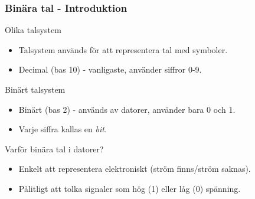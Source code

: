\begin{frame}
\begin{columns}[T]
\begin{column}{0.4\textwidth}
\begin{center}
            \end{center}
        \end{column}
    \end{columns}
    
\end{frame}

\begin{frame}
    \frametitle{Binära tal - Introduktion}
    \begin{block}{Olika talsystem}
        \begin{itemize}
            \item Talsystem används för att representera tal med symboler.
            \item Decimal (bas 10) - vanligaste, använder siffror 0-9.
        \end{itemize}
    \end{block}
    \begin{block}{Binärt talsystem}
        \begin{itemize}
            \item Binärt (bas 2) - används av datorer, använder bara 0 och 1.
            \item Varje siffra kallas en \textit{bit}.
        \end{itemize}
    \end{block}
    \begin{block}{Varför binära tal i datorer?}
        \begin{itemize}
            \item Enkelt att representera elektroniskt (ström finns/ström saknas).
            \item Pålitligt att tolka signaler som hög (1) eller låg (0) spänning.
        \end{itemize}
    \end{block}
\end{frame}

